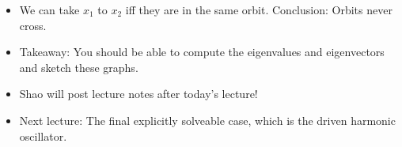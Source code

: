 \documentclass[../notes.tex]{subfiles}
\begin{document}
\begin{itemize}
\begin{itemize}
        \begin{align*}
            y &= (z^1\e[t\lambda]+z^2t\e[t\lambda])\hat{\imath}+z^2\e[t\lambda]\hat{\jmath}
            \intertext{Define $x:=\e[t\lambda]$. Then $t=\lambda^{-1}\ln x$. Substituting, we have}
            &= (z^1x+z^2(\lambda^{-1}\ln x)x)\hat{\imath}+z^2x\hat{\jmath}\\
            &= (z^1x+z^2\lambda^{-1}x\ln x)\hat{\imath}+z^2x\hat{\jmath}
        \end{align*}
        \item When $\lambda>0$, the whole space is unstable. Thus, the phase diagram is tangent to the origin.
        \item When $\lambda<0$, the trajectories take the same form but this time are attracted to zero. In this case, the whole space is stable.
    \end{itemize}
    \item We can take $x_1$ to $x_2$ iff they are in the same orbit. Conclusion: Orbits never cross.
    \item Takeaway: You should be able to compute the eigenvalues and eigenvectors and sketch these graphs.
    \item Shao will post lecture notes after today's lecture!
    \item Next lecture: The final explicitly solveable case, which is the driven harmonic oscillator.
\end{itemize}
\end{document}
